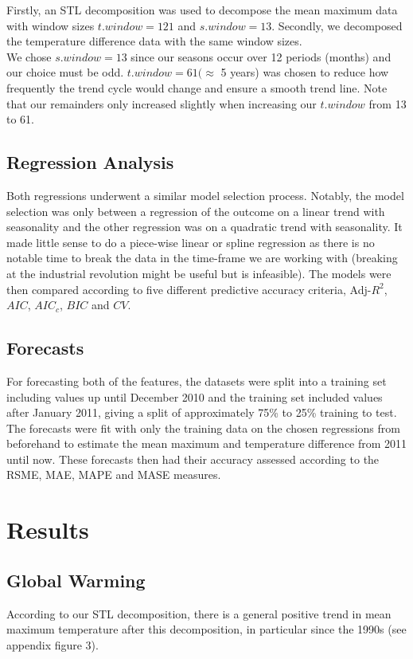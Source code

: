 \documentclass[12pt]{article}
\begin{document}
{Firstly, an STL decomposition was used to decompose the mean maximum data with window sizes $t.window = 121$ and $s.window = 13$. Secondly, we decomposed the temperature difference data with the same window sizes.\\

We chose $s.window = 13$ since our seasons occur over 12 periods (months) and our choice must be odd. $t.window = 61 (\approx$ 5 years) was chosen to reduce how frequently the trend cycle would change and ensure a smooth trend line. Note that our remainders only increased slightly when increasing our $t.window$ from 13 to 61.

\subsection*{Regression Analysis}
Both regressions underwent a similar model selection process. Notably, the model selection was only between a regression of the outcome on a linear trend with seasonality and the other regression was on a quadratic trend with seasonality. It made little sense to do a piece-wise linear or spline regression as there is no notable time to break the data in the time-frame we are working with (breaking at the industrial revolution might be useful but is infeasible). The models were then compared according to five different predictive accuracy criteria, Adj-$R^2$, $AIC$, $AIC_c$, $BIC$ and $CV$.

\subsection*{Forecasts}
For forecasting both of the features, the datasets were split into a training set including values up until December 2010 and the training set included values after January 2011, giving a split of approximately 75\% to 25\% training to test.\\

The forecasts were fit with only the training data on the chosen regressions from beforehand to estimate the mean maximum and temperature difference from 2011 until now. These forecasts then had their accuracy assessed according to the RSME, MAE, MAPE and MASE measures.

\section*{Results}
\subsection*{Global Warming}
According to our STL decomposition, there is a general positive trend in mean maximum temperature after this decomposition, in particular since the 1990s (see appendix figure 3).\\

}
\end{document}
